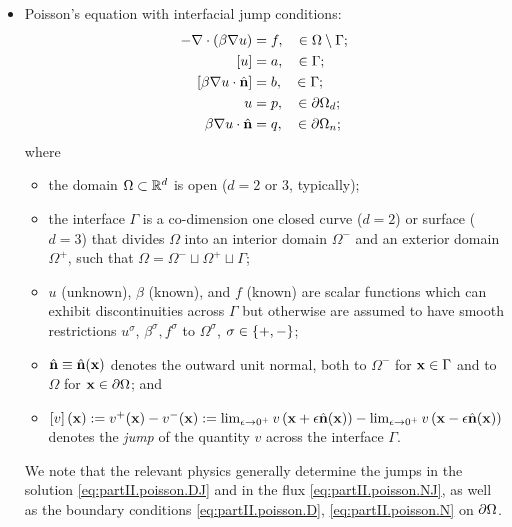 \begin{itemize}

\item Poisson's equation with interfacial jump conditions:
\begin{subequations} \label{eq:partII.poisson}
\begin{align}
-\nabla \cdot \left( \beta \nabla u \right) & = f, \quad \in \Omega \setminus \Gamma; \label{eq:partII.poisson.PDE} \\
\left[ u \right] & = a, \quad \in \Gamma; \label{eq:partII.poisson.DJ} \\
\left[ \beta \nabla u \cdot \hat{\mathbf{n}} \right] & = b, \quad \in \Gamma; \label{eq:partII.poisson.NJ} \\
u & = p, \quad \in \partial\Omega_d; \label{eq:partII.poisson.D} \\
\beta \nabla u \cdot \hat{\mathbf{n}} & = q, \quad \in \partial\Omega_n; \label{eq:partII.poisson.N}
\end{align}
\end{subequations}
where
\begin{itemize}
\item the domain $\Omega \subset \mathbb{R}^d$ is open ($d = 2 \text{ or } 3$, typically);
\item the interface $\Gamma$ is a co-dimension one closed curve ($d = 2$) or surface ($d = 3$) that divides $\Omega$ into an interior domain $\Omega^-$ and an exterior domain $\Omega^+$, such that $\Omega = \Omega^- \sqcup \Omega^+ \sqcup \Gamma$;
\item $u$ (unknown), $\beta$ (known), and $f$ (known) are scalar functions which can exhibit discontinuities across $\Gamma$ but otherwise are assumed to have smooth restrictions $u^{\sigma}$, $\beta^{\sigma}, f^{\sigma}$ to $\Omega^{\sigma}$, $\sigma \in \left\lbrace +,- \right\rbrace$;
\item $\hat{\mathbf{n}} \equiv \hat{\mathbf{n}}(\mathbf{x})$ denotes the outward unit normal, both to $\Omega^-$ for $\mathbf{x} \in \Gamma$ and to $\Omega$ for $\mathbf{x} \in \partial\Omega$; and
\item $\left[ v \right](\mathbf{x}) := v^+(\mathbf{x}) - v^-(\mathbf{x}) := \lim_{\epsilon \to 0^+} v\left( \mathbf{x} + \epsilon \hat{\mathbf{n}}(\mathbf{x}) \right) - \lim_{\epsilon \to 0^+} v\left( \mathbf{x} - \epsilon \hat{\mathbf{n}}(\mathbf{x}) \right)$ denotes the \emph{jump} of the quantity $v$ across the interface $\Gamma$.
\end{itemize}
We note that the relevant physics generally determine the jumps in the solution \eqref{eq:partII.poisson.DJ} and in the flux \eqref{eq:partII.poisson.NJ}, as well as the boundary conditions \eqref{eq:partII.poisson.D}, \eqref{eq:partII.poisson.N} on $\partial\Omega$.


\end{itemize}
